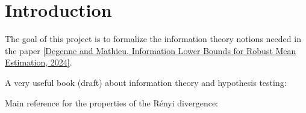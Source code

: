\chapter*{Introduction}

The goal of this project is to formalize the information theory notions needed in the paper \href{https://arxiv.org/abs/2403.01892}{[Degenne and Mathieu, Information Lower Bounds for Robust Mean Estimation, 2024]}.

A very useful book (draft) about information theory and hypothesis testing: \cite{polyanskiy2024information} 

Main reference for the properties of the Rényi divergence: \cite{van2014renyi}